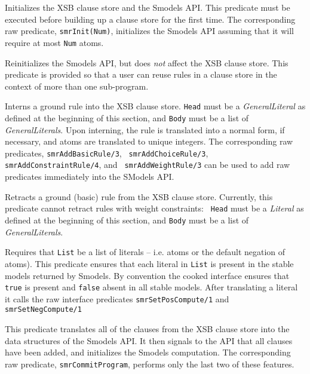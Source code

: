 \begin{description}
%
Initializes the XSB clause store and the Smodels API.  This predicate
must be executed before building up a clause store for the first time.
The corresponding raw predicate, {\tt smrInit(Num)}, initializes the
Smodels API assuming that it will require at most {\tt Num} atoms.

%
Reinitializes the Smodels API, but does \emph{not} affect the XSB
clause store.  This predicate is provided so that a user can reuse
rules in a clause store in the context of more than one sub-program.

%
Interns a ground rule into the XSB clause store.  {\tt Head} must be a
\emph{GeneralLiteral} as defined at the beginning of this section, and
     {\tt Body} must be a list of \emph{GeneralLiterals}.  Upon
     interning, the rule is translated into a normal form, if
     necessary, and atoms are translated to unique integers.  The
     corresponding raw predicates, {\tt smrAddBasicRule/3}, {\tt
       smrAddChoiceRule/3}, {\tt smrAddConstraintRule/4}, and {\tt
       smrAddWeightRule/3} can be used to add raw predicates
     immediately into the SModels API.

%
Retracts a ground (basic) rule from the XSB clause store.  Currently,
this predicate cannot retract rules with weight constraints: {\tt
  Head} must be a \emph{Literal} as defined at the beginning of this
section, and {\tt Body} must be a list of \emph{GeneralLiterals}.

%
Requires that {\tt List} be a list of literals -- i.e. atoms or the
default negation of atoms).  This predicate ensures that each literal
in {\tt List} is present in the stable models returned by Smodels.  By
convention the cooked interface ensures that {\tt true} is present and
{\tt false} absent in all stable models.  After translating a literal
it calls the raw interface predicates {\tt smrSetPosCompute/1} and
{\tt smrSetNegCompute/1}

%
This predicate translates all of the clauses from the XSB clause store
into the data structures of the Smodels API.  It then signals to the
API that all clauses have been added, and initializes the Smodels
computation.  The corresponding raw predicate, {\tt smrCommitProgram},
performs only the last two of these features.


\end{description}
